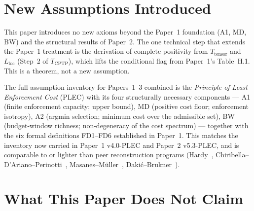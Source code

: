 \documentclass[11pt]{article}
\begin{document}
\section{New Assumptions Introduced}
\label{app:assumptions}

This paper introduces no new axioms beyond the Paper~1 foundation
(A1, MD, BW) and the structural results of Paper~2.  The one technical
step that extends the Paper~1 treatment is the derivation of complete
positivity from $T_{\mathrm{tensor}}$ and $L_{\mathrm{loc}}$ (Step~2 of
$T_{\mathrm{CPTP}}$), which lifts the conditional flag from Paper~1's
Table~H.1.  This is a theorem, not a new assumption.

The full assumption inventory for Papers~1--3 combined is the
\emph{Principle of Least Enforcement Cost} (PLEC) with its four
structurally necessary components --- A1 (finite enforcement capacity;
upper bound), MD (positive cost floor; enforcement isotropy), A2 (argmin
selection; minimum cost over the admissible set), BW (budget-window
richness; non-degeneracy of the cost spectrum) --- together with the six
formal definitions FD1--FD6 established in Paper~1.  This matches the
inventory now carried in Paper~1 v4.0-PLEC and Paper~2 v5.3-PLEC, and is
comparable to or lighter than peer reconstruction programs
(Hardy~\cite{Hardy2001}, Chiribella--D'Ariano--Perinotti~\cite{CDP2011},
Masanes--M\"uller~\cite{MM2011}, Daki\'c--Brukner~\cite{DakicBrukner2009}).


\section{What This Paper Does Not Claim}
\label{app:scope}
\end{document}
